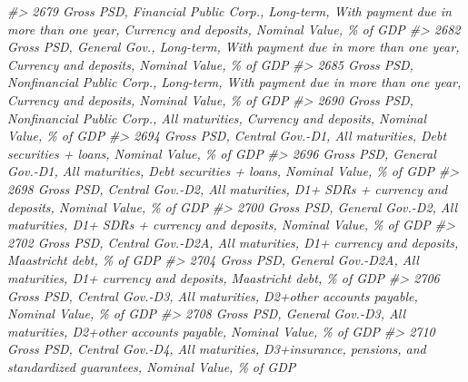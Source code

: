 \documentclass[
]{bxjsbook}
\newenvironment{Shaded}{\begin{snugshade}}{\end{snugshade}}
\newcommand{\CommentTok}[1]{\textcolor[rgb]{0.56,0.35,0.01}{\textit{#1}}}
\theoremstyle{definition}
\theoremstyle{definition}
\theoremstyle{definition}
\theoremstyle{definition}
\theoremstyle{remark}
\begin{document}
\begin{Shaded}
\begin{Highlighting}[]
\CommentTok{\#\textgreater{} 2679                                       Gross PSD, Financial Public Corp., Long{-}term, With payment due in more than one year, Currency and deposits, Nominal Value, \% of GDP}
\CommentTok{\#\textgreater{} 2682                                                 Gross PSD, General Gov., Long{-}term, With payment due in more than one year, Currency and deposits, Nominal Value, \% of GDP}
\CommentTok{\#\textgreater{} 2685                                    Gross PSD, Nonfinancial Public Corp., Long{-}term, With payment due in more than one year, Currency and deposits, Nominal Value, \% of GDP}
\CommentTok{\#\textgreater{} 2690                                                                       Gross PSD, Nonfinancial Public Corp., All maturities, Currency and deposits, Nominal Value, \% of GDP}
\CommentTok{\#\textgreater{} 2694                                                                               Gross PSD, Central Gov.{-}D1, All maturities, Debt securities + loans, Nominal Value, \% of GDP}
\CommentTok{\#\textgreater{} 2696                                                                               Gross PSD, General Gov.{-}D1, All maturities, Debt securities + loans, Nominal Value, \% of GDP}
\CommentTok{\#\textgreater{} 2698                                                                      Gross PSD, Central Gov.{-}D2, All maturities, D1+ SDRs + currency and deposits, Nominal Value, \% of GDP}
\CommentTok{\#\textgreater{} 2700                                                                      Gross PSD, General Gov.{-}D2, All maturities, D1+ SDRs + currency and deposits, Nominal Value, \% of GDP}
\CommentTok{\#\textgreater{} 2702                                                                          Gross PSD, Central Gov.{-}D2A, All maturities, D1+ currency and deposits, Maastricht debt, \% of GDP}
\CommentTok{\#\textgreater{} 2704                                                                          Gross PSD, General Gov.{-}D2A, All maturities, D1+ currency and deposits, Maastricht debt, \% of GDP}
\CommentTok{\#\textgreater{} 2706                                                                             Gross PSD, Central Gov.{-}D3, All maturities, D2+other accounts payable, Nominal Value, \% of GDP}
\CommentTok{\#\textgreater{} 2708                                                                             Gross PSD, General Gov.{-}D3, All maturities, D2+other accounts payable, Nominal Value, \% of GDP}
\CommentTok{\#\textgreater{} 2710                                                   Gross PSD, Central Gov.{-}D4, All maturities, D3+insurance, pensions, and standardized guarantees, Nominal Value, \% of GDP}

\end{Highlighting}
\end{Shaded}
\end{document}

